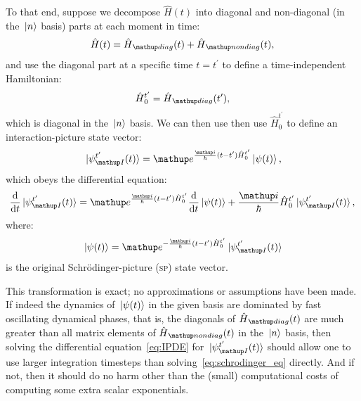 To that end, suppose we decompose $\hat H(t)$ into diagonal and non-diagonal (in the $\ket{n}$ basis) parts at each moment in time:
\begin{align}
\hat H(t) = \hat H_\up{diag}(t) + \hat H_\up{nondiag}(t),
\end{align}
and use the diagonal part at a specific time $t=t^\prime$ to define a time-independent Hamiltonian:
\begin{align}\label{eq:H0def}
 \hat H_0^{t^\prime} = \hat H_\up{diag}(t^\prime),
\end{align}
which is diagonal in the $\ket{n}$ basis. We can then use then use $\hat H_0^{t^\prime}$ to define an interaction-picture state vector:
\begin{align}\label{eq:IP_definition}
\ket{\psi_\up{I}^{t^\prime}(t)} = \ee^{\frac \ii \hbar (t - t^\prime) \hat H_0^{t^\prime}}\ket{\psi(t)},
\end{align}
which obeys the differential equation:
\begin{align}\label{eq:IPDE}
\dv t \ket{\psi_\up{I}^{t^\prime}(t)}
    = \ee^{\frac \ii \hbar (t - t^\prime) \hat H_0^{t^\prime}}\dv t \ket{\psi(t)}
      + \frac \ii\hbar \hat H_0^{t^\prime}\ket{\psi_\up{I}^{t^\prime}(t)},
\end{align}
where:
\begin{align}\label{eq:backtransform}
\ket{\psi(t)} = \ee^{-\frac \ii \hbar (t - t^\prime) \hat H_0^{t^\prime}}\ket{\psi_\up{I}^{t^\prime}(t)}
\end{align}
is the original Schr\"odinger-picture (\textsc{sp}) state vector.

This transformation is exact; no approximations or assumptions have been made. If indeed the dynamics of $\ket{\psi(t)}$ in the given basis are dominated by fast oscillating dynamical phases, that is, the diagonals of $\hat H_\up{diag}(t)$ are much greater than all matrix elements of $\hat H_\up{nondiag}(t)$ in the $\ket{n}$ basis, then solving the differential equation~\eqref{eq:IPDE} for $\ket{\psi_\up{I}^{t^\prime}(t)}$ should allow one to use larger integration timesteps than solving~\eqref{eq:schrodinger_eq} directly. And if not, then it should do no harm other than the (small) computational costs of computing some extra scalar exponentials.

